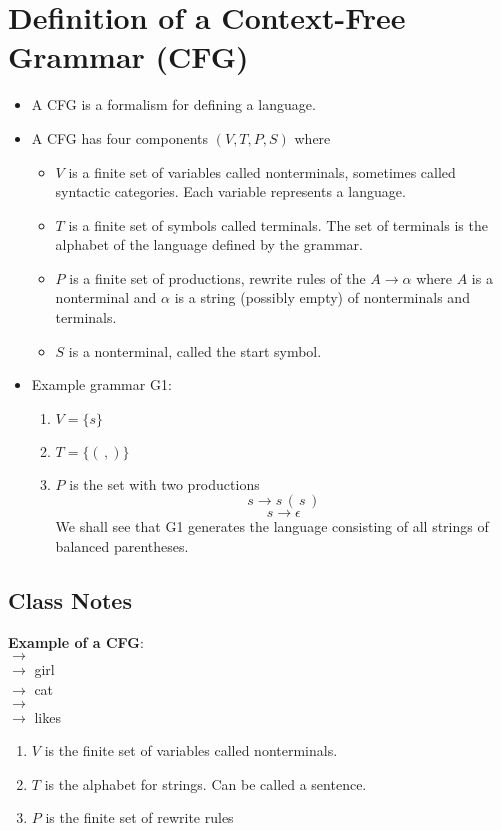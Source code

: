 \documentclass[]{article}
\begin{document}
\section{Definition of a Context-Free Grammar (CFG)}
  \begin{itemize}
    \item A CFG is a formalism for defining a language.
    \item A CFG has four components $(V, T, P, S)$ where
      \begin{itemize}
        \item $V$ is a finite set of variables called nonterminals, sometimes 
        called syntactic categories. Each variable represents a language.
        \item $T$ is a finite set of symbols called terminals. The set of 
        terminals is the alphabet of the language defined by the grammar.
        \item $P$ is a finite set of productions, rewrite rules of the $A 
        \rightarrow \alpha$ where $A$ is a nonterminal and $\alpha$ is a string
        (possibly empty) of nonterminals and terminals.
        \item $S$ is a nonterminal, called the start symbol.
      \end{itemize}
    \item Example grammar G1:
      \begin{enumerate}
        \item $V = \{ s \}$
        \item $T = \{ ( \, ,) \}$
        \item $P$ is the set with two productions
          \[ s \rightarrow s \, ( \, s \, ) \]
          \[ s \rightarrow \epsilon \]
        We shall see that G1 generates the language consisting of all strings of
        balanced parentheses.
      \end{enumerate}
  \end{itemize}
  \subsection*{Class Notes}
    \textbf{Example of a CFG}: \\
        $\rightarrow$  \\
     $\rightarrow$ girl \\
     $\rightarrow$ cat  \\
     $\rightarrow$  \\
            $\rightarrow$ likes
    \begin{enumerate}
      \item $V$ is the finite set of variables called nonterminals.
      \item $T$ is the alphabet for strings. Can be called a sentence.
      \item $P$ is the finite set of rewrite rules
    \end{enumerate}
\end{document}

